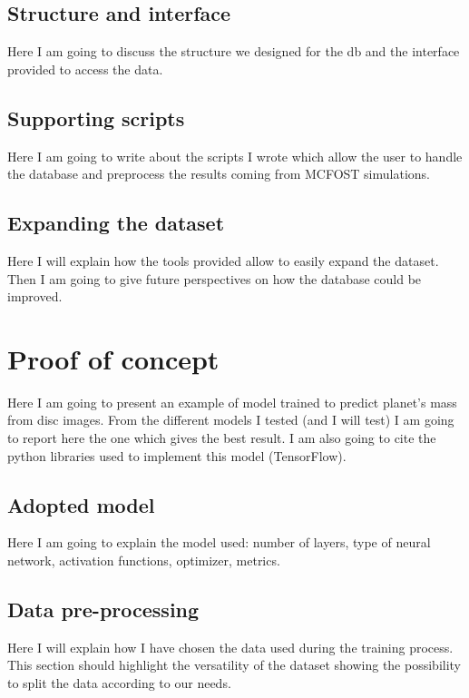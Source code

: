 \documentclass[a4paper,10pt]{report}
\begin{document}
\section{Structure and interface}

Here I am going to discuss the structure we designed for the db and the interface provided to 
access the data.

\section{Supporting scripts}

Here I am going to write about the scripts I wrote which allow the user to handle the database
and preprocess the results coming from MCFOST simulations.

\section{Expanding the dataset}

Here I will explain how the tools provided allow to easily expand the dataset. 
Then I am going to give future perspectives on how the database could be improved.

\chapter{Proof of concept}

Here I am going to present an example of model trained to predict planet's mass from 
disc images.
From the different models I tested (and I will test)
I am going to report here the one which gives the best result.
I am also going to cite the python libraries used to implement this model (TensorFlow).

\section{Adopted model}

Here I am going to explain the model used: number of layers, type of neural network, activation functions,
optimizer, metrics.

\section{Data pre-processing}

Here I will explain how I have chosen the data used during the training process.
This section should highlight the versatility of the dataset showing the possibility to split the 
data according to our needs.
\end{document}
